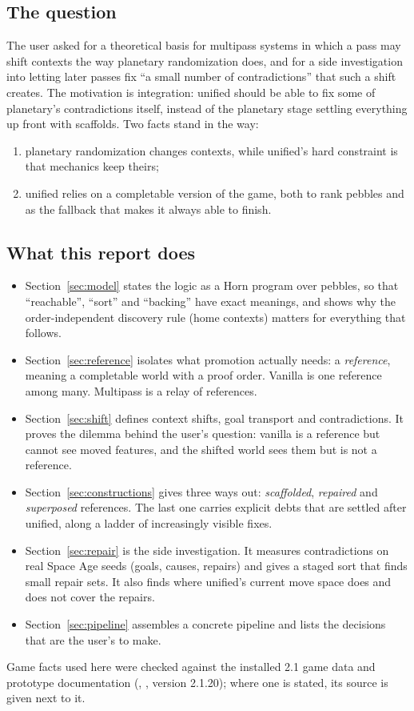 \subsection{The question}

The user asked for a theoretical basis for multipass systems in which a pass may shift contexts the way planetary randomization does, and for a side investigation into letting later passes fix ``a small number of contradictions'' that such a shift creates. The motivation is integration: unified should be able to fix some of planetary's contradictions itself, instead of the planetary stage settling everything up front with scaffolds. Two facts stand in the way:
\begin{enumerate}[nosep]
\item planetary randomization changes contexts, while unified's hard constraint is that mechanics keep theirs;
\item unified relies on a completable version of the game, both to rank pebbles and as the fallback that makes it always able to finish.
\end{enumerate}

\subsection{What this report does}

\begin{itemize}[nosep]
\item Section~\ref{sec:model} states the logic as a Horn program over pebbles, so that ``reachable'', ``sort'' and ``backing'' have exact meanings, and shows why the order-independent discovery rule (home contexts) matters for everything that follows.
\item Section~\ref{sec:reference} isolates what promotion actually needs: a \emph{reference}, meaning a completable world with a proof order. Vanilla is one reference among many. Multipass is a relay of references.
\item Section~\ref{sec:shift} defines context shifts, goal transport and contradictions. It proves the dilemma behind the user's question: vanilla is a reference but cannot see moved features, and the shifted world sees them but is not a reference.
\item Section~\ref{sec:constructions} gives three ways out: \emph{scaffolded}, \emph{repaired} and \emph{superposed} references. The last one carries explicit debts that are settled after unified, along a ladder of increasingly visible fixes.
\item Section~\ref{sec:repair} is the side investigation. It measures contradictions on real Space Age seeds (goals, causes, repairs) and gives a staged sort that finds small repair sets. It also finds where unified's current move space does and does not cover the repairs.
\item Section~\ref{sec:pipeline} assembles a concrete pipeline and lists the decisions that are the user's to make.
\end{itemize}

Game facts used here were checked against the installed 2.1 game data and prototype documentation (, , version 2.1.20); where one is stated, its source is given next to it.

